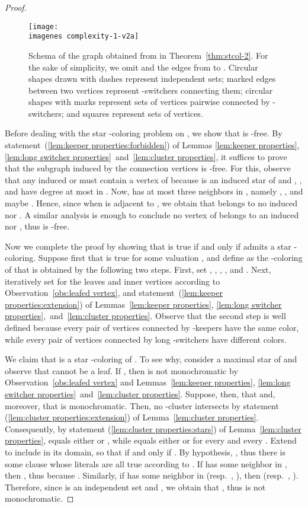 \documentclass[a4paper, 11pt, oneside]{article}
\def\imagenes{}
\begin{document}
\begin{proof}
\begin{figure}
  \centering
  \texttt{[image: \\imagenes complexity-1-v2a]}
  \caption{Schema of the graph obtained from  in Theorem~\ref{thm:stcol-2}.  For the sake of simplicity, we omit  and the edges from  to .  Circular shapes drawn with dashes represent independent sets; marked edges between two vertices represent -switchers connecting them; circular shapes with marks represent sets of vertices pairwise connected by -switchers; and squares represent sets of vertices.}\label{fig:coloring2}
\end{figure}

  Before dealing with the star -coloring problem on , we show that  is -free.  By statement~(\ref{lem:keeper properties:forbidden}) of Lemmas \ref{lem:keeper properties}, \ref{lem:long switcher properties}~and~\ref{lem:cluster properties}, it suffices to prove that the subgraph  induced by the connection vertices is -free.  For this, observe that any induced  or  must contain a vertex of  because  is an induced star of  and , , and  have degree at most  in .   Now,  has at most three neighbors in , namely , , and maybe .  Hence, since  when  is adjacent to , we obtain that  belongs to no induced  nor .  A similar analysis is enough to conclude no vertex of  belongs to an induced  nor , thus  is -free.

  Now we complete the proof by showing that  is true if and only if  admits a star -coloring.  Suppose first that  is true for some valuation , and define  as the -coloring of  that is obtained by the following two steps.  First, set , , , , and .  Next, iteratively set  for the leaves and inner vertices according to Observation~\ref{obs:leafed vertex}, and statement~(\ref{lem:keeper properties:extension}) of Lemmas~\ref{lem:keeper properties}, \ref{lem:long switcher properties},~and~\ref{lem:cluster properties}.  Observe that the second step is well defined because every pair of vertices connected by -keepers have the same color, while every pair of vertices connected by long -switchers have different colors.

  We claim that  is a star -coloring of .  To see why, consider a maximal star  of  and observe that  cannot be a leaf.  If , then  is not monochromatic by Observation~\ref{obs:leafed vertex} and Lemmas~\ref{lem:keeper properties}, \ref{lem:long switcher properties}~and~\ref{lem:cluster properties}.  Suppose, then, that  and, moreover, that  is monochromatic.  Then, no -cluster intersects  by statement (\ref{lem:cluster properties:extension}) of Lemma~\ref{lem:cluster properties}.  Consequently, by statement (\ref{lem:cluster properties:stars}) of Lemma~\ref{lem:cluster properties},  equals either  or , while  equals either  or  for every  and every .  Extend  to include  in its domain, so that  if and only if .  By hypothesis, , thus there is some clause  whose literals are all true according to .  If  has some neighbor in , then , thus  because .  Similarly, if  has some neighbor in  (resp.\ , ), then  (resp.\ , ).  Therefore, since  is an independent set and , we obtain that , thus  is not monochromatic.


\end{proof}
\end{document}
